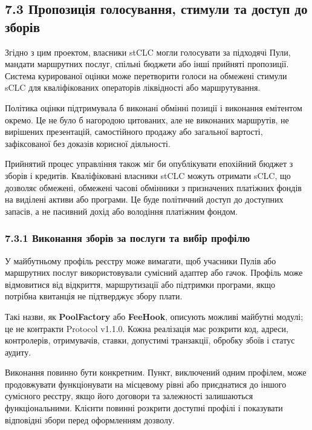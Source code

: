 \documentclass[11pt]{article}
\begin{document}
\subsection*{7.3 Пропозиція голосування, стимули та доступ до зборів}

Згідно з цим проектом, власники stCLC могли голосувати за підходячі Пули, мандати маршрутних послуг, спільні бюджети або інші прийняті пропозиції. Система курированої оцінки може перетворити голоси на обмежені стимули sCLC для кваліфікованих операторів ліквідності або маршрутування.

Політика оцінки підтримувала б виконані обмінні позиції і виконання емітентом окремо. Це не було б нагородою цитованих, але не виконаних маршрутів, не вирішених презентацій, самостійного продажу або загальної вартості, зафіксованої без доказів корисної діяльності.

Прийнятий процес управління також міг би опублікувати епохійний бюджет з зборів і кредитів. Кваліфіковані власники stCLC можуть отримати sCLC, що дозволяє обмежені, обмежені часові обмінники з призначених платіжних фондів на виділені активи або програми. Це буде політичний доступ до доступних запасів, а не пасивний дохід або володіння платіжним фондом.

\subsubsection*{7.3.1 Виконання зборів за послуги та вибір профілю}

У майбутньому профіль реєстру може вимагати, щоб учасники Пулів або маршрутних послуг використовували сумісний адаптер або гачок. Профіль може відмовитися від відкриття, маршрутизації або підтримки програми, якщо потрібна квитанція не підтверджує збору плати.

Такі назви, як \textbf{PoolFactory} або \textbf{FeeHook}, описують можливі майбутні модулі; це не контракти Protocol v1.1.0. Кожна реалізація має розкрити код, адреси, контролерів, отримувачів, ставки, допустимі транзакції, обробку збоїв і статус аудиту.

Виконання повинно бути конкретним. Пункт, виключений одним профілем, може продовжувати функціонувати на місцевому рівні або приєднатися до іншого сумісного реєстру, якщо його договори та залежності залишаються функціональними. Клієнти повинні розкрити доступні профілі і показувати відповідні збори перед оформленням дозволу.
\end{document}
